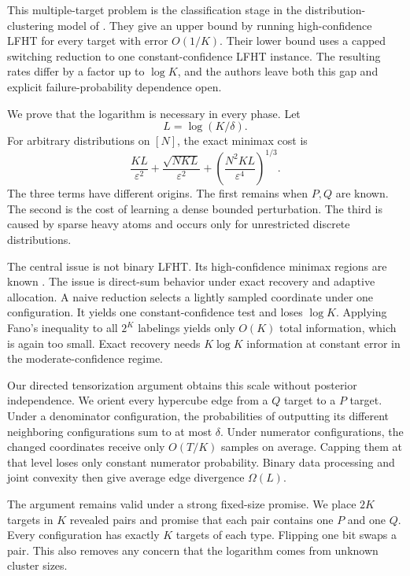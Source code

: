 \documentclass[twoside]{article}
\begin{document}
This multiple-target problem is the classification stage in the distribution-clustering model of \citet{kumar2026clustering}. They give an upper bound by running high-confidence LFHT for every target with error $O(1/K)$. Their lower bound uses a capped switching reduction to one constant-confidence LFHT instance. The resulting rates differ by a factor up to $\log K$, and the authors leave both this gap and explicit failure-probability dependence open.

We prove that the logarithm is necessary in every phase. Let
\[
L=\log(K/\delta).
\]
For arbitrary distributions on $[N]$, the exact minimax cost is
\begin{equation}
\frac{KL}{\varepsilon^2}
+\frac{\sqrt{NKL}}{\varepsilon^2}
+\left(\frac{N^2KL}{\varepsilon^4}\right)^{1/3}.
\label{eq:headline}
\end{equation}
The three terms have different origins. The first remains when $P,Q$ are known. The second is the cost of learning a dense bounded perturbation. The third is caused by sparse heavy atoms and occurs only for unrestricted discrete distributions.

The central issue is not binary LFHT. Its high-confidence minimax regions are known \citep{gerber2023classification}. The issue is direct-sum behavior under exact recovery and adaptive allocation. A naive reduction selects a lightly sampled coordinate under one configuration. It yields one constant-confidence test and loses $\log K$. Applying Fano's inequality to all $2^K$ labelings yields only $O(K)$ total information, which is again too small. Exact recovery needs $K\log K$ information at constant error in the moderate-confidence regime.

Our directed tensorization argument obtains this scale without posterior independence. We orient every hypercube edge from a $Q$ target to a $P$ target. Under a denominator configuration, the probabilities of outputting its different neighboring configurations sum to at most $\delta$. Under numerator configurations, the changed coordinates receive only $O(T/K)$ samples on average. Capping them at that level loses only constant numerator probability. Binary data processing and joint convexity then give average edge divergence $\Omega(L)$.

The argument remains valid under a strong fixed-size promise. We place $2K$ targets in $K$ revealed pairs and promise that each pair contains one $P$ and one $Q$. Every configuration has exactly $K$ targets of each type. Flipping one bit swaps a pair. This also removes any concern that the logarithm comes from unknown cluster sizes.
\end{document}
